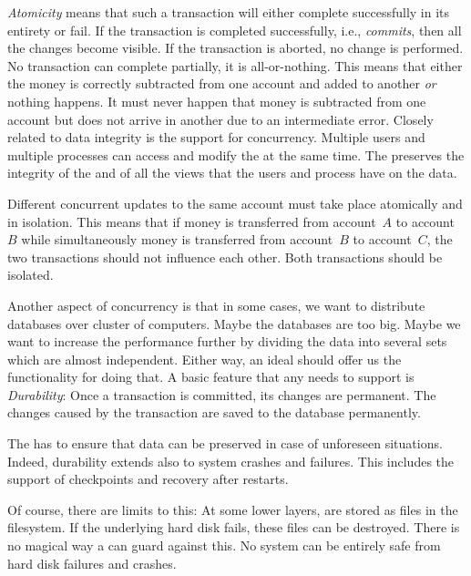 \emph{Atomicity} means that such a transaction will either complete successfully in its entirety or fail.
If the transaction is completed successfully, i.e., \emph{commits}, then all the changes become visible.
If the transaction is aborted, no change is performed.
No transaction can complete partially, it is all-or-nothing.
This means that either the money is correctly subtracted from one account and added to another \emph{or} nothing happens.
It must never happen that money is subtracted from one account but does not arrive in another due to an intermediate error.%
\endhsection%
%
%
Closely related to data integrity is the support for concurrency.
Multiple users and multiple processes can access and modify the  at the same time.
The  preserves the integrity of the  and of all the views that the users and process have on the data.

Different concurrent updates to the same account must take place atomically and in isolation.
This means that if money is transferred from account~$A$ to account~$B$ while simultaneously money is transferred from account~$B$ to account~$C$, the two transactions should not influence each other.
Both transactions should be isolated.

Another aspect of concurrency is that in some cases, we want to distribute databases over cluster of computers.
Maybe the databases are too big.
Maybe we want to increase the performance further by dividing the data into several sets which are almost independent.
Either way, an ideal  should offer us the functionality for doing that.%
\endhsection%
%
%
%
A basic feature that any  needs to support is \emph{Durability}:
Once a transaction is committed, its changes are permanent.
The changes caused by the transaction are saved to the database permanently.

The  has to ensure that data can be preserved in case of unforeseen situations.
Indeed, durability extends also to system crashes and failures.
This includes the support of checkpoints and recovery after restarts.

Of course, there are limits to this:
At some lower layers,  are stored as files in the filesystem.
If the underlying hard disk fails, these files can be destroyed.
There is no magical way a  can guard against this.
No system can be entirely safe from hard disk failures and crashes.


